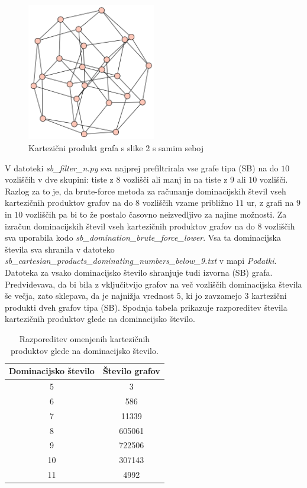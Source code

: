 \documentclass{article}
\begin{document}
\begin{figure}[h!]
    \centering
    \includegraphics[width=0.5\textwidth]{sb_min_cartesian_example.png} %
    \caption{Kartezični produkt grafa s slike 2 s samim seboj}
    
\end{figure}

V datoteki \emph{sb\_filter\_n.py} sva najprej prefiltrirala vse grafe tipa (SB) na do $10$ vozliščih 
v dve skupini: tiste z $8$ vozlišči ali manj in na tiste z $9$ ali $10$ vozlišči. Razlog za to je, da brute-force metoda 
za računanje dominacijskih števil vseh kartezičnih produktov grafov na do $8$ vozliščih vzame približno $11$ ur, z grafi na $9$ in $10$ vozliščih pa bi to 
že postalo časovno neizvedljivo za najine možnosti. Za izračun dominacijskih števil vseh kartezičnih 
produktov grafov na do $8$ vozliščih sva uporabila kodo \emph{sb\_domination\_brute\_force\_lower}. Vsa ta dominacijska števila sva shranila 
v datoteko \emph{sb\_cartesian\_products\_dominating\_numbers\_below\_9.txt} v mapi \emph{Podatki}.
Datoteka za vsako dominacijsko število shranjuje tudi izvorna (SB) grafa.
Predvidevava, da bi bila z vključitvijo grafov na več vozliščih dominacijska števila še večja, 
zato sklepava, da je najnižja vrednost $5$, ki jo zavzamejo $3$ kartezični produkti dveh grafov tipa (SB).
Spodnja tabela prikazuje razporeditev števila kartezičnih produktov glede na dominacijsko število.

\begin{table}[h!]
    \centering
    \begin{tabular}{|c|c|}
        \hline
        Dominacijsko število & Število grafov \\ \hline
        5 & 3 \\ \hline
        6 & 586 \\ \hline
        7 & 11339 \\ \hline
        8 & 605061 \\ \hline
        9 & 722506 \\ \hline
        10 & 307143 \\ \hline
        11 & 4992 \\ \hline
    \end{tabular}
    \caption{Razporeditev omenjenih kartezičnih produktov glede na dominacijsko število.}
\end{table}
\end{document}
